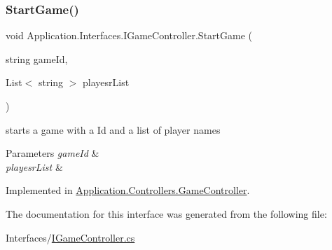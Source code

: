 \subsubsection{\texorpdfstring{Start\+Game()}{StartGame()}}
{\footnotesize\ttfamily void Application.\+Interfaces.\+I\+Game\+Controller.\+Start\+Game (\begin{DoxyParamCaption}\item[{string}]{game\+Id,  }\item[{List$<$ string $>$}]{playesr\+List }\end{DoxyParamCaption})}



starts a game with a Id and a list of player names 


\begin{DoxyParams}{Parameters}
{\em game\+Id} & \\
\hline
{\em playesr\+List} & \\
\hline
\end{DoxyParams}


Implemented in \mbox{\hyperlink{class_application_1_1_controllers_1_1_game_controller_aca897a6c639e043db85b41049d550cf2}{Application.\+Controllers.\+Game\+Controller}}.



The documentation for this interface was generated from the following file\+:\begin{DoxyCompactItemize}
\item 
Interfaces/\mbox{\hyperlink{_i_game_controller_8cs}{I\+Game\+Controller.\+cs}}\end{DoxyCompactItemize}
